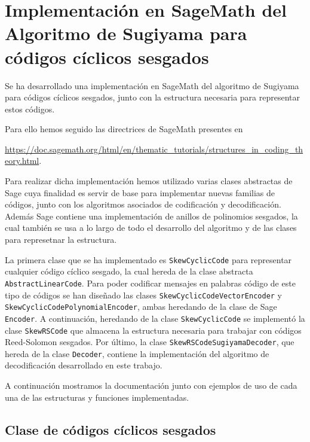 \chapter{Implementación en SageMath del Algoritmo de Sugiyama para códigos cíclicos sesgados}%
\label{chap:implementación_en_sagemath_del_algoritmo_de_sugiyama_para_códigos_cíclicos_sesgados}

Se ha desarrollado una implementación en SageMath del algoritmo de Sugiyama para códigos cíclicos sesgados, junto con la estructura necesaria para representar estos códigos.

Para ello hemos seguido las directrices de SageMath presentes en
\begin{center}
\url{https://doc.sagemath.org/html/en/thematic_tutorials/structures_in_coding_theory.html}.
\end{center}
 Para realizar dicha implementación hemos utilizado varias clases abstractas de Sage cuya finalidad es servir de base para implementar nuevas familias de códigos, junto con los algoritmos asociados de codificación y decodificación. Además Sage contiene una implementación de anillos de polinomios sesgados, la cual también se usa a lo largo de todo el desarrollo del algoritmo y de las clases para represetnar la estructura.

La primera clase que se ha implementado es \texttt{SkewCyclicCode} para representar cualquier código cíclico sesgado, la cual hereda de la clase abstracta \texttt{AbstractLinearCode}. Para poder codificar mensajes en palabras código de este tipo de códigos se han diseñado las clases \texttt{SkewCyclicCodeVectorEncoder} y \texttt{SkewCyclicCodePolynomialEncoder}, ambas heredando de la clase de Sage \texttt{Encoder}. A continuación, heredando de la clase \texttt{SkewCyclicCode} se implementó la clase \texttt{SkewRSCode} que almacena la estructura necesaria para trabajar con códigos Reed-Solomon sesgados. Por último, la clase \texttt{SkewRSCodeSugiyamaDecoder}, que hereda de la clase \texttt{Decoder}, contiene la implementación del algoritmo de decodificación desarrollado en este trabajo.

A continuación mostramos la documentación junto con ejemplos de uso de cada una de las estructuras y funciones implementadas.

\newpage
\section{Clase de códigos cíclicos sesgados}%
\label{sec:clase_de_códigos_cíclicos_sesgados}

